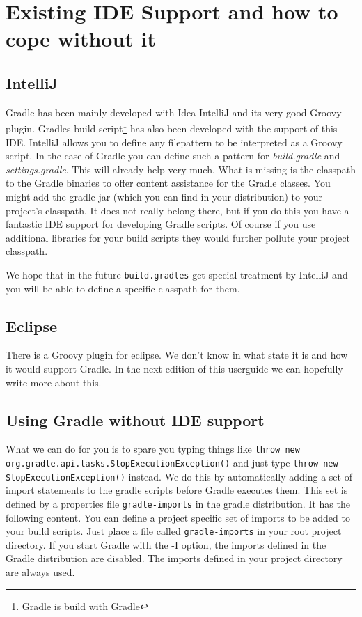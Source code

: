 \chapter{Existing IDE Support and how to cope without it} %
\label{cha:ide_support}
\section{IntelliJ} %
\label{sec:intellij}
Gradle has been mainly developed with Idea IntelliJ and its very good Groovy plugin. Gradles build script\footnote{Gradle is build with Gradle} has also been developed with the support of this IDE. IntelliJ allows you to define any filepattern to be interpreted as a Groovy script. In the case of Gradle you can define such a pattern for \emph{build.gradle} and \emph{settings.gradle}. This will already help very much. What is missing is the classpath to the Gradle binaries to offer content assistance for the Gradle classes. You might add the gradle jar (which you can find in your distribution) to your project's classpath. It does not really belong there, but if you do this you have a fantastic IDE support for developing Gradle scripts. Of course if you use additional libraries for your build scripts they would further pollute your project classpath.  

We hope that in the future \texttt{build.gradles} get special treatment by IntelliJ and you will be able to define a specific classpath for them.

\section{Eclipse} %
There is a Groovy plugin for eclipse. We don't know in what state it is and how it would support Gradle. In the next edition of this userguide we can hopefully write more about this.

\section{Using Gradle without IDE support} %
\label{sec:using_gradle_without_ide_support}
What we can do for you is to spare you typing things like \texttt{throw new org.gradle.api.tasks.StopExecutionException()} and just type \texttt{throw new StopExecutionException()} instead. We do this by automatically adding a set of import statements to the gradle scripts before Gradle executes them. This set is defined by a properties file \texttt{gradle-imports} in the gradle distribution. It has the following content.
You can define a project specific set of imports to be added to your build scripts. Just place a file called \texttt{gradle-imports} in your root project directory. If you start Gradle with the {-I} option, the imports defined in the Gradle distribution are disabled. The imports defined in your project directory are always used.


